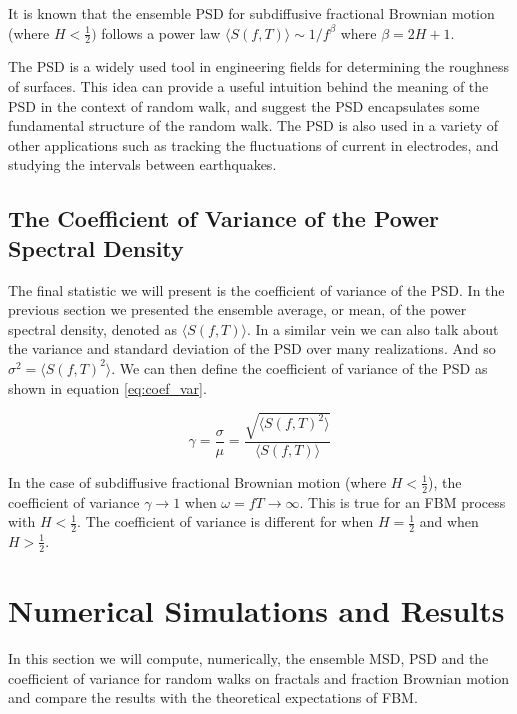 \documentclass[%
 reprint,
 amsmath,amssymb,
 aps,
]{revtex4-2}
\begin{document}
It is known that the ensemble PSD for subdiffusive fractional Brownian motion (where $H< \frac{1}{2})$ follows a power law $\langle S(f,T)\rangle\sim 1/f^\beta$ where $\beta={2H+1}$\cite{krapf_spectral_2019}.

The PSD is a widely used tool in engineering fields for determining the roughness of surfaces\cite{andren_power_2006, elson_calculation_1995}. This idea can provide a useful intuition behind the meaning of the PSD in the context of random walk, and suggest the PSD encapsulates some fundamental structure of the random walk. The PSD is also used in a variety of other applications such as tracking the fluctuations of current in electrodes\cite{krapf_nonergodicity_2012}, and studying the intervals between earthquakes\cite{sornette_self-organized_1989}.

\subsection{The Coefficient of Variance of the Power Spectral Density}
The final statistic we will present is the coefficient of variance of the PSD. In the previous section we presented the ensemble average, or mean, of the power spectral density, denoted as $\langle S(f,T)\rangle$. In a similar vein we can also talk about the variance and standard deviation of the PSD over many realizations. And so $\sigma^2=\langle S(f,T)^2 \rangle$. We can then define the coefficient of variance of the PSD as shown in equation \ref{eq:coef_var}.

\begin{equation}
\label{eq:coef_var}
    \gamma = \frac{\sigma}{\mu}=\frac{\sqrt{\langle S(f,T)^2 \rangle}}{\langle S(f,T) \rangle}
\end{equation}

In the case of subdiffusive fractional Brownian motion (where $H<\frac{1}{2}$), the coefficient of variance $\gamma\rightarrow 1$ when $\omega=fT\rightarrow \infty$. This is true for an FBM process with $H< \frac{1}{2}$. The coefficient of variance is different for when $H=\frac{1}{2}$ and when $H>\frac{1}{2}$\cite{krapf_spectral_2019}.

\section{Numerical Simulations and Results}
\label{sec:numbers}
In this section we will compute, numerically, the ensemble MSD, PSD and the coefficient of variance for random walks on fractals and fraction Brownian motion and compare the results with the theoretical expectations of FBM.
\end{document}
